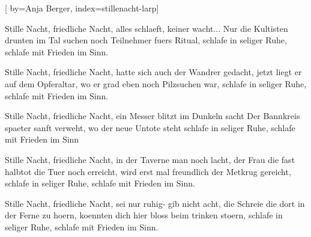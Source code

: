 

[%
    by={Anja Berger},
    index={stillenacht-larp}]


    \label{stillenacht-larp}



    \beginverse\memorize[verse]
        Stille Nacht, friedliche Nacht,
        alles schlaeft, keiner wacht...
        Nur die Kultisten drunten im Tal
        suchen noch Teilnehmer fuers Ritual,
        schlafe in seliger Ruhe,
        schlafe mit Frieden im Sinn.
    \endverse

    \beginverse\replay[verse]
        Stille Nacht, friedliche Nacht,
        hatte sich auch der Wandrer gedacht,
        jetzt liegt er auf dem Opferaltar,
        wo er grad eben noch Pilzsuchen war,
        schlafe in seliger Ruhe,
        schlafe mit Frieden im Sinn.
    \endverse

    \beginverse\replay[verse]
        Stille Nacht, friedliche Nacht,
        ein Messer blitzt im Dunkeln sacht
        Der Bannkreis spaeter sanft verweht,
        wo der neue Untote steht
        schlafe in seliger Ruhe,
        schlafe mit Frieden im Sinn
    \endverse

    \beginverse\replay[verse]
        Stille Nacht, friedliche Nacht,
        in der Taverne man noch lacht,
        der Frau die fast halbtot die Tuer noch erreicht,
        wird erst mal freundlich der Metkrug gereicht,
        schlafe in seliger Ruhe,
        schlafe mit Frieden im Sinn.
    \endverse

    \beginverse\replay[verse]
        Stille Nacht, friedliche Nacht,
        sei nur ruhig- gib nicht acht,
        die Schreie die dort in der Ferne zu hoern,
        koennten dich hier bloss beim trinken stoern,
        schlafe in seliger Ruhe,
        schlafe mit Frieden im Sinn.
    \endverse
\endsong
